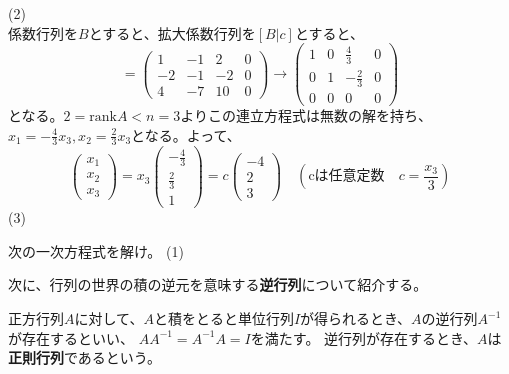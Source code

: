 \documentclass{jlreq}
\begin{document}
\begin{problem}
  (2) \\
  係数行列を$B$とすると、拡大係数行列を$[B|c]$とすると、
  \begin{equation*}
    [B|c] = \begin{pmatrix}
      1 & -1 & 2 & 0 \\
      -2 & -1 & -2 & 0 \\
      4 & -7 & 10 & 0
    \end{pmatrix} \rightarrow \begin{pmatrix}
      1 & 0 & \frac{4}{3} & 0 \\
      0 & 1 & -\frac{2}{3} & 0 \\
      0 & 0 & 0 & 0
    \end{pmatrix}
  \end{equation*}
  となる。$2 = \mathrm{rank} A < n = 3$よりこの連立方程式は無数の解を持ち、$x_1 = -\frac{4}{3} x_3, x_2 = \frac{2}{3} x_3$となる。よって、
  \begin{equation*}
    \begin{pmatrix}
      x_1 \\ x_2 \\ x_3
    \end{pmatrix} = x_3 \begin{pmatrix}
      -\frac{4}{3} \\ \frac{2}{3} \\ 1
    \end{pmatrix} = c \begin{pmatrix}
      -4 \\ 2 \\ 3
    \end{pmatrix}
    \quad (\text{cは任意定数} \quad c = \frac{x_3}{3})
  \end{equation*}
  (3) \\

\end{problem}

\begin{problem}
  次の一次方程式を解け。
  (1) \\
  
\end{problem}

次に、行列の世界の積の逆元を意味する\textbf{逆行列}について紹介する。

\begin{definitionbox}[逆行列]
  正方行列$A$に対して、$A$と積をとると単位行列$I$が得られるとき、$A$の逆行列$A^{-1}$が存在するといい、
  $A A^{-1} = A^{-1} A = I$を満たす。 逆行列が存在するとき、$A$は\textbf{正則行列}であるという。
\end{definitionbox}
\end{document}
